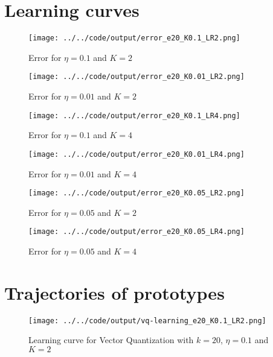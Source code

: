 \documentclass[twoside, a4paper, fleqn, reqno]{article}
\begin{document}
\section{Learning curves}

\begin{figure}[H]
	\centering
	\texttt{[image: ../../code/output/error\_e20\_K0.1\_LR2.png]}
	\caption{Error for $\eta = 0.1$ and $K = 2$}
	\label{fig:error_e20_K0.1_LR2}
\end{figure}

\begin{figure}[H]
	\centering
	\texttt{[image: ../../code/output/error\_e20\_K0.01\_LR2.png]}
	\caption{Error for $\eta = 0.01$ and $K = 2$}
	\label{fig:error_e20_K0.01_LR2}
\end{figure}

\begin{figure}[H]
	\centering
	\texttt{[image: ../../code/output/error\_e20\_K0.1\_LR4.png]}
	\caption{Error for $\eta = 0.1$ and $K = 4$}
	\label{fig:error_e20_K0.1_LR4}
\end{figure}

\begin{figure}[H]
	\centering
	\texttt{[image: ../../code/output/error\_e20\_K0.01\_LR4.png]}
	\caption{Error for $\eta = 0.01$ and $K = 4$}
	\label{fig:error_e20_K0.01_LR4}
\end{figure}

\begin{figure}[H]
	\centering
	\texttt{[image: ../../code/output/error\_e20\_K0.05\_LR2.png]}
	\caption{Error for $\eta = 0.05$ and $K = 2$}
	\label{fig:error_e20_K0.05_LR2}
\end{figure}

\begin{figure}[H]
	\centering
	\texttt{[image: ../../code/output/error\_e20\_K0.05\_LR4.png]}
	\caption{Error for $\eta = 0.05$ and $K = 4$}
	\label{fig:error_e20_K0.05_LR4}
\end{figure}

\section{Trajectories of prototypes}

\begin{figure}[H]
	\centering
	\texttt{[image: ../../code/output/vq-learning\_e20\_K0.1\_LR2.png]}
	\caption{Learning curve for Vector Quantization with $k=20$, $\eta=0.1$ and $K=2$}
	\label{fig:vq-learning_e20_K0.1_LR2}
\end{figure}
\end{document}
